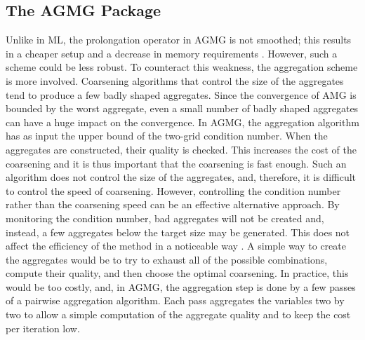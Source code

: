 \documentclass[preprint,10pt]{elsarticle}
\renewcommand{\(}{\left(}
\renewcommand{\)}{\right)}
\renewcommand{\[}{\left[}
\renewcommand{\]}{\right]}
\begin{document}
\subsection{The AGMG Package}
Unlike in ML, the prolongation operator in AGMG is not smoothed; this results in a
cheaper setup and a decrease in memory requirements \cite{agmg2}. However,
such a scheme could be less robust. To counteract this weakness, the
aggregation scheme is more involved. Coarsening algorithms that control
the size of the aggregates tend to produce a few badly shaped aggregates.
Since the convergence of AMG is bounded by the worst aggregate, even a small 
number of badly shaped aggregates can have a huge impact on
the convergence. In AGMG, the aggregation algorithm has as input the upper
bound of the two-grid condition number. When the aggregates are constructed,
their quality is checked. This increases the cost of the coarsening
and it is thus important that the coarsening is fast enough. Such an 
algorithm does not control the size of the aggregates, and, therefore, it is 
difficult to control the speed of coarsening. However, controlling the condition 
number rather than the coarsening speed can be an effective alternative approach. By 
monitoring the condition number, bad aggregates will not be created and, instead, 
a few aggregates below the target size may be generated. This  
does not affect the efficiency of the method in a noticeable way \cite{agmg2}. 
A simple way to create the aggregates would be to try to exhaust all of the possible 
combinations, compute their quality, and then choose the optimal
coarsening. In practice, this would be too costly, and, in AGMG, the aggregation 
step is done by a few passes of a pairwise aggregation algorithm. Each pass
aggregates the variables two by two to allow a simple computation of the aggregate 
quality and to keep the cost per iteration low. 
\end{document}
